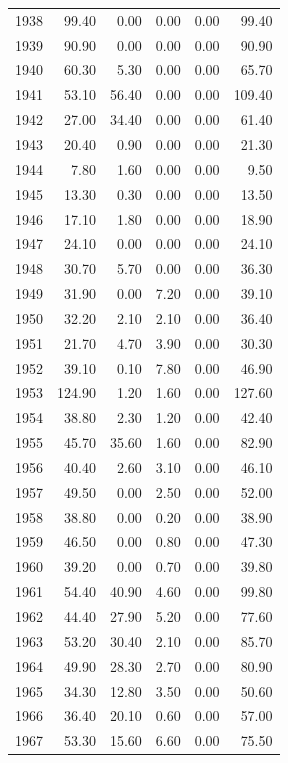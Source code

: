 \documentclass[12pt,]{article}
\begin{document}
\begin{longtable}{rrrrrr}
  1938 & 99.40 & 0.00 & 0.00 & 0.00 & 99.40 \\ 
  1939 & 90.90 & 0.00 & 0.00 & 0.00 & 90.90 \\ 
  1940 & 60.30 & 5.30 & 0.00 & 0.00 & 65.70 \\ 
  1941 & 53.10 & 56.40 & 0.00 & 0.00 & 109.40 \\ 
  1942 & 27.00 & 34.40 & 0.00 & 0.00 & 61.40 \\ 
  1943 & 20.40 & 0.90 & 0.00 & 0.00 & 21.30 \\ 
  1944 & 7.80 & 1.60 & 0.00 & 0.00 & 9.50 \\ 
  1945 & 13.30 & 0.30 & 0.00 & 0.00 & 13.50 \\ 
  1946 & 17.10 & 1.80 & 0.00 & 0.00 & 18.90 \\ 
  1947 & 24.10 & 0.00 & 0.00 & 0.00 & 24.10 \\ 
  1948 & 30.70 & 5.70 & 0.00 & 0.00 & 36.30 \\ 
  1949 & 31.90 & 0.00 & 7.20 & 0.00 & 39.10 \\ 
  1950 & 32.20 & 2.10 & 2.10 & 0.00 & 36.40 \\ 
  1951 & 21.70 & 4.70 & 3.90 & 0.00 & 30.30 \\ 
  1952 & 39.10 & 0.10 & 7.80 & 0.00 & 46.90 \\ 
  1953 & 124.90 & 1.20 & 1.60 & 0.00 & 127.60 \\ 
  1954 & 38.80 & 2.30 & 1.20 & 0.00 & 42.40 \\ 
  1955 & 45.70 & 35.60 & 1.60 & 0.00 & 82.90 \\ 
  1956 & 40.40 & 2.60 & 3.10 & 0.00 & 46.10 \\ 
  1957 & 49.50 & 0.00 & 2.50 & 0.00 & 52.00 \\ 
  1958 & 38.80 & 0.00 & 0.20 & 0.00 & 38.90 \\ 
  1959 & 46.50 & 0.00 & 0.80 & 0.00 & 47.30 \\ 
  1960 & 39.20 & 0.00 & 0.70 & 0.00 & 39.80 \\ 
  1961 & 54.40 & 40.90 & 4.60 & 0.00 & 99.80 \\ 
  1962 & 44.40 & 27.90 & 5.20 & 0.00 & 77.60 \\ 
  1963 & 53.20 & 30.40 & 2.10 & 0.00 & 85.70 \\ 
  1964 & 49.90 & 28.30 & 2.70 & 0.00 & 80.90 \\ 
  1965 & 34.30 & 12.80 & 3.50 & 0.00 & 50.60 \\ 
  1966 & 36.40 & 20.10 & 0.60 & 0.00 & 57.00 \\ 
  1967 & 53.30 & 15.60 & 6.60 & 0.00 & 75.50 \\ 

\end{longtable}
\end{document}
